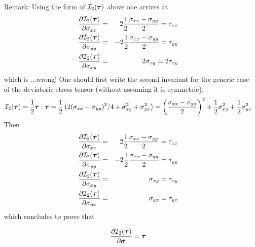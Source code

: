 Remark: Using the form of ${\cal I}_2(\bm\tau)$ above one arrives at  
\begin{eqnarray}
\frac{\partial {\cal I}_2(\bm\tau)}{\partial \sigma_{xx}} 
&=&  2 \frac{1}{2}  \frac{\sigma_{xx}-\sigma_{yy}}{2} = \tau_{xx}\nonumber \\
\frac{\partial {\cal I}_2(\bm\tau)}{\partial \sigma_{yy}} 
&=& -2 \frac{1}{2}  \frac{\sigma_{xx}-\sigma_{yy}}{2} = \tau_{yy} \nonumber\\
\frac{\partial {\cal I}_2(\bm\tau)}{\partial \sigma_{xy}} 
&=& 2 \sigma_{xy} =  2 \tau_{xy}\nonumber
\end{eqnarray}
which is ...wrong! One should first write the second invariant 
for the generic case of the deviatoric stress tensor (without 
assuming it is symmetric):
\[
{\cal I}_2(\bm\tau) = \frac12 \bm\tau:\bm\tau
= \frac12 \left( 2 (\sigma_{xx}-\sigma_{yy})^2/4 + \sigma_{xy}^2 + \sigma_{yx}^2 \right)
= \left(\frac{\sigma_{xx}-\sigma_{yy}}{2} \right)^2 + \frac12\sigma_{xy}^2 + \frac12\sigma_{yx}^2
\]
Then
\begin{eqnarray}
\frac{\partial {\cal I}_2(\bm\tau)}{\partial \sigma_{xx}} 
&=&  2 \frac{1}{2}  \frac{\sigma_{xx}-\sigma_{yy}}{2} = \tau_{xx} \nonumber\\
\frac{\partial {\cal I}_2(\bm\tau)}{\partial \sigma_{yy}} 
&=& -2 \frac{1}{2}  \frac{\sigma_{xx}-\sigma_{yy}}{2} =  \tau_{yy} \nonumber\\
\frac{\partial {\cal I}_2(\bm\tau)}{\partial \sigma_{xy}} 
&=&  \sigma_{xy} =  \tau_{xy} \nonumber\\
\frac{\partial {\cal I}_2(\bm\tau)}{\partial \sigma_{yx}} 
&=&  \sigma_{yx} =  \tau_{yx} \nonumber
\end{eqnarray}
which concludes to prove that 
\begin{mdframed}[backgroundcolor=blue!5]
\[
\frac{\partial {\cal I}_2(\bm\tau)}{\partial \bm\sigma} 
=\bm\tau
\]
\end{mdframed}



















